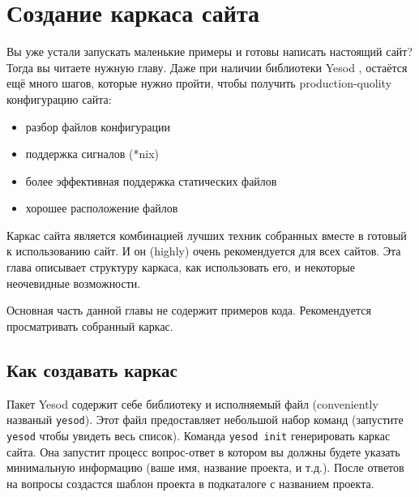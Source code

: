 \chapter{Создание каркаса сайта}

Вы уже устали запускать маленькие примеры и готовы написать настоящий сайт?
Тогда вы читаете нужную главу. Даже при наличии библиотеки Yesod ,
остаётся ещё много шагов, которые нужно пройти, чтобы получить production-quolity 
конфигурацию сайта:

\begin{itemize}
  \item разбор файлов конфигурации
  \item поддержка сигналов (*nix)
  \item более эффективная поддержка статических файлов
  \item хорошее расположение файлов 
\end{itemize}

Каркас сайта является комбинацией лучших техник собранных вместе в готовый к 
использованию сайт. И он (highly) очень рекомендуется для всех сайтов.
Эта глава описывает структуру каркаса, как использовать его, и некоторые 
неочевидные возможности.

Основная часть данной главы не содержит примеров кода. Рекомендуется 
просматривать собранный каркас. 


\section{Как создавать каркас}

Пакет Yesod содержит  себе библиотеку и исполняемый файл (conveniently 
названый \lstinline!yesod!). Этот файл предоставляет небольшой набор 
команд (запустите \lstinline!yesod! чтобы увидеть весь список). Команда
\lstinline!yesod init! генерировать каркас сайта. Она запустит процесс
вопрос-ответ в котором вы должны будете указать минимальную информацию
(ваше имя, название проекта, и т.д.). После ответов на вопросы создастся 
шаблон проекта в подкаталоге с названием проекта.

